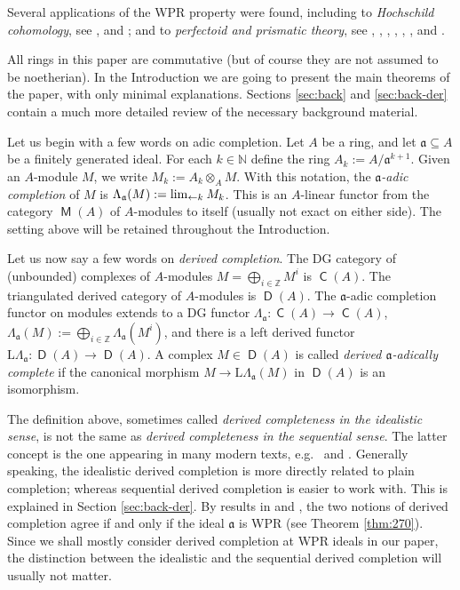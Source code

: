 \documentclass[10pt]{amsart}
\theoremstyle{definition}
\numberwithin{equation}{section}
\newcommand{\lto}{\leftarrow}
\newcommand{\sub}{\subseteq}
\newcommand{\cat}[1]{\operatorname{\mathsf{#1}}}
\newcommand{\mfrak}[1]{\mathfrak{#1}}
\newcommand{\mrm}[1]{\mathrm{#1}}
\newcommand{\La}{\Lambda}
\renewcommand{\a}{\mfrak{a}}
\newcommand{\Z}{\mathbb{Z}}
\newcommand{\N}{\mathbb{N}}
\newcommand{\boplus}{\bigoplus\nolimits}
\newcommand{\ot}{\otimes}
\newcommand{\msp}[1]{\mspace{#1 mu}}
\begin{document}
Several applications of the WPR property were found,
including to {\em Hochschild cohomology}, see \cite{Sh1}, \cite{Sh2} and
\cite{Sh3}; and to {\em perfectoid and prismatic theory}, see \cite{CS},
\cite{BS}, \cite{Ce}, \cite{DLMS}, \cite{It}, \cite{NS}, \cite{IKY} and
\cite{BMS}.

All rings in this paper are commutative (but of course they are not assumed
to be noetherian). In the Introduction we are going to present the main
theorems of the paper, with only minimal explanations. Sections \ref{sec:back}
and \ref{sec:back-der} contain a much more detailed review of the necessary
background material.

Let us begin with a few words on adic completion.
Let $A$ be a ring, and let $\a \sub A$ be a finitely generated ideal.
For each $k \in \N$ define the ring $A_k := A / \a^{k + 1}$.
Given an $A$-module $M$, we write
$M_k := A_k \ot_A M$. With this notation, the {\em $\a$-adic completion} of $M$
is $\La_{\a}(M) := \lim_{\lto k} \msp{1} M_k$.
This is an $A$-linear functor from the category  $\cat{M}(A)$
of $A$-modules to itself (usually not exact on either side).
The setting above will be retained throughout the Introduction.

Let us now say a few words on {\em derived completion}.
The DG category of (unbounded)  complexes of $A$-modules
$M = \boplus_{i \in \Z} M^i$ is $\cat{C}(A)$.
The triangulated derived category of $A$-modules is $\cat{D}(A)$.
The $\a$-adic completion functor on modules extends to a DG functor
$\La_{\a} : \cat{C}(A) \to \cat{C}(A)$,
$\La_{\a}(M) := \boplus_{i \in \Z} \La_{\a}(M^i)$,
and there is a left derived functor
$\mrm{L} \La_{\a} : \cat{D}(A) \to \cat{D}(A)$.
A complex $M \in \cat{D}(A)$ is called {\em derived $\a$-adically complete} if
the canonical morphism $M \to \mrm{L} \La_{\a}(M)$ in $\cat{D}(A)$ is an
isomorphism.

The definition above, sometimes called {\em derived completeness in the
idealistic sense}, is not the same as  {\em derived completeness in the
sequential sense}. The latter concept is the one appearing in many modern
texts, e.g.\ \cite{SP} and \cite{BS}.
Generally speaking, the idealistic derived completion is more directly related
to plain completion; whereas sequential derived completion is easier to work
with. This is explained in Section \ref{sec:back-der}.
By results in \cite{PSY1} and \cite{Po2}, the two notions of derived
completion agree if and only if the ideal $\a$ is WPR (see Theorem
\ref{thm:270}). Since we shall mostly consider derived completion at WPR ideals
in our paper, the distinction between the idealistic and the sequential derived
completion will usually not matter.
\end{document}
